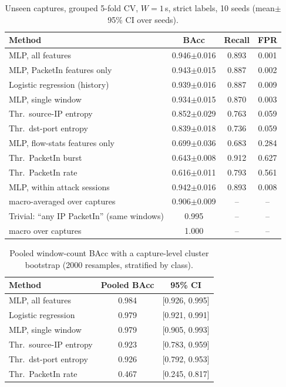 \begin{table}[t]
\caption{Unseen captures, grouped 5-fold CV, $W{=}1$\,s, strict labels, 10 seeds (mean{\scriptsize$\pm$}95\% CI over seeds).}
\label{tab:cv}
\centering\footnotesize\setlength{\tabcolsep}{3pt}
\begin{tabular}{lccc}
\toprule
Method & BAcc & Recall & FPR \\
\midrule
MLP, all features & 0.946{\scriptsize$\pm$0.016} & 0.893 & 0.001 \\
MLP, PacketIn features only & 0.943{\scriptsize$\pm$0.015} & 0.887 & 0.002 \\
Logistic regression (history) & 0.939{\scriptsize$\pm$0.016} & 0.887 & 0.009 \\
MLP, single window & 0.934{\scriptsize$\pm$0.015} & 0.870 & 0.003 \\
Thr.\ source-IP entropy & 0.852{\scriptsize$\pm$0.029} & 0.763 & 0.059 \\
Thr.\ dst-port entropy & 0.839{\scriptsize$\pm$0.018} & 0.736 & 0.059 \\
MLP, flow-stats features only & 0.699{\scriptsize$\pm$0.036} & 0.683 & 0.284 \\
Thr.\ PacketIn burst & 0.643{\scriptsize$\pm$0.008} & 0.912 & 0.627 \\
Thr.\ PacketIn rate & 0.616{\scriptsize$\pm$0.011} & 0.793 & 0.561 \\
\midrule
MLP, within attack sessions & 0.942{\scriptsize$\pm$0.016} & 0.893 & 0.008 \\
\quad macro-averaged over captures & 0.906{\scriptsize$\pm$0.009} & -- & -- \\
Trivial: ``any IP PacketIn'' (same windows) & 0.995 & -- & -- \\
\quad macro over captures & 1.000 & -- & -- \\
\bottomrule
\end{tabular}
\end{table}

\begin{table}[t]
\caption{Pooled window-count BAcc with a capture-level cluster bootstrap (2000 resamples, stratified by class).}
\label{tab:boot}
\centering\footnotesize\setlength{\tabcolsep}{3pt}
\begin{tabular}{lcc}
\toprule
Method & Pooled BAcc & 95\% CI \\
\midrule
MLP, all features & 0.984 & [0.926, 0.995] \\
Logistic regression & 0.979 & [0.921, 0.991] \\
MLP, single window & 0.979 & [0.905, 0.993] \\
Thr.\ source-IP entropy & 0.923 & [0.783, 0.959] \\
Thr.\ dst-port entropy & 0.926 & [0.792, 0.953] \\
Thr.\ PacketIn rate & 0.467 & [0.245, 0.817] \\
\bottomrule
\end{tabular}
\end{table}

